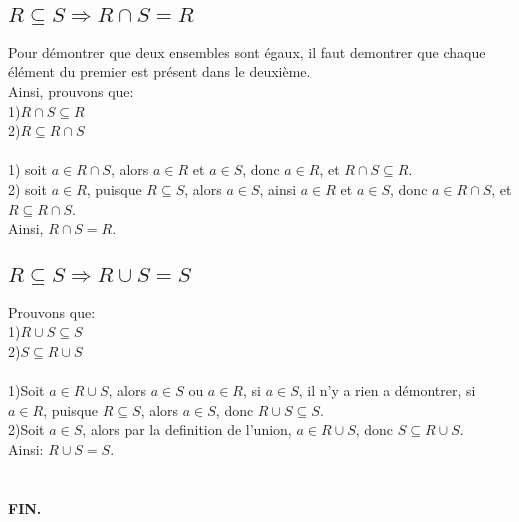 \documentclass[12pt]{article}
\begin{document}
\subsection{$R \subseteq S \Rightarrow R \cap S = R$ }
Pour démontrer que deux ensembles sont égaux, il faut demontrer que chaque élément du premier est présent dans le deuxième.\\
Ainsi, prouvons que:\\
1)$ R \cap S \subseteq R$\\
2)$ R \subseteq R \cap S$\\
\\
1) soit $a \in R \cap S$, alors $a \in R$ et $a \in S$, donc $a \in R$, et $R \cap S \subseteq R$.\\
2) soit $a \in R$, puisque $R \subseteq S$, alors $a \in S$, ainsi $a \in R$ et $a \in S$, donc $a \in R \cap S$, et $R \subseteq R \cap S$.
\\
Ainsi, $R \cap S = R$.

\subsection{$R \subseteq S \Rightarrow R \cup S = S$}
Prouvons que:\\
1)$R \cup S \subseteq S $\\
2)$S \subseteq R \cup S $\\
\\
1)Soit $a \in R \cup S$, alors $a \in S$ ou $a \in R$, si $a \in S$, il n'y a rien a démontrer, si $a \in R$, puisque $R \subseteq S$, alors $a \in S$, donc $R \cup S \subseteq S$. \\
2)Soit $a \in S$, alors par la definition de l'union, $a \in R \cup S$, donc $S \subseteq R \cup S$.
\\
Ainsi: $R \cup S = S$.
\\
\\
\\
\textbf{FIN.}
\end{document}
